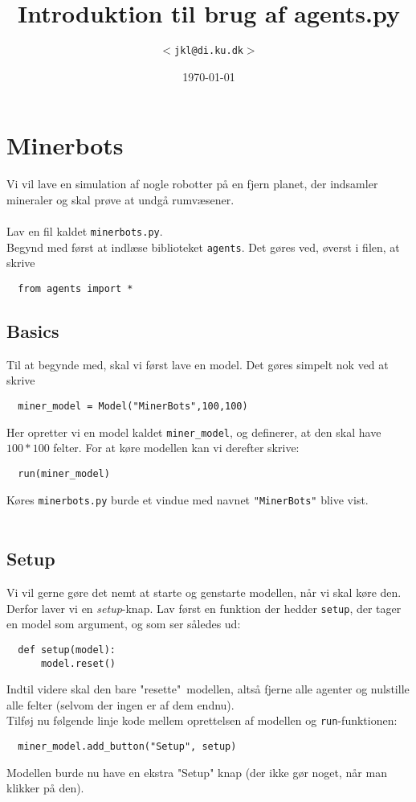 \documentclass[12pt]{article}
\title{Introduktion til brug af agents.py}
\author{$<$\texttt{jkl@di.ku.dk}$>$}
\date{\today}
\begin{document}
\maketitle

\noindent
\section{Minerbots}
Vi vil lave en simulation af nogle robotter på en fjern planet, der indsamler mineraler og skal prøve at undgå rumvæsener.\\\\
\noindent
Lav en fil kaldet \texttt{minerbots.py}.\\
Begynd med først at indlæse biblioteket \texttt{agents}. Det gøres ved, øverst i filen, at skrive
\begin{lstlisting}
  from agents import *
\end{lstlisting}
\subsection{Basics}
Til at begynde med, skal vi først lave en model. Det gøres simpelt nok ved at skrive
\begin{lstlisting}
  miner_model = Model("MinerBots",100,100)
\end{lstlisting}
Her opretter vi en model kaldet \texttt{miner\_model}, og definerer, at den skal have $100 * 100$ felter. For at køre modellen kan vi derefter skrive:
\begin{lstlisting}
  run(miner_model)
\end{lstlisting}
Køres \texttt{minerbots.py} burde et vindue med navnet \texttt{"MinerBots"} blive vist.\\\\

\subsection{Setup}
Vi vil gerne gøre det nemt at starte og genstarte modellen, når vi skal køre den. Derfor laver vi en \textit{setup}-knap. Lav først en funktion der hedder \texttt{setup}, der tager en model som argument, og som ser således ud:
\begin{lstlisting}
  def setup(model):
      model.reset()
\end{lstlisting}
Indtil videre skal den bare "resette"\ modellen, altså fjerne alle agenter og nulstille alle felter (selvom der ingen er af dem endnu).\\
Tilføj nu følgende linje kode mellem oprettelsen af modellen og \texttt{run}-funktionen:
\begin{lstlisting}
  miner_model.add_button("Setup", setup)
\end{lstlisting}
Modellen burde nu have en ekstra "Setup" knap (der ikke gør noget, når man klikker på den).
\end{document}
